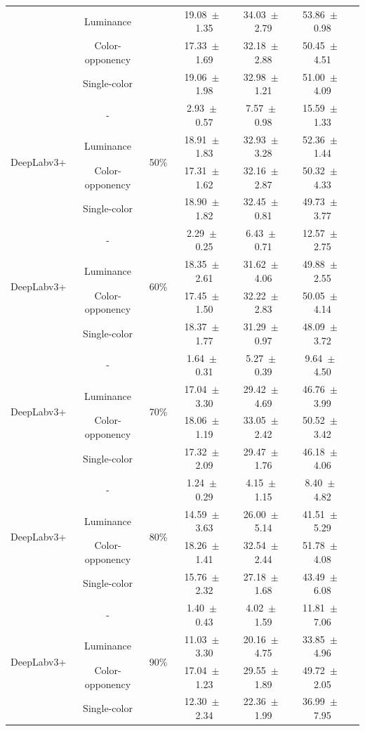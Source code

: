 \begin{table}[h]
\begin{tabular}{@{}lccc ccc@{}}
& Luminance & & 19.08~$\pm$~1.35 & 34.03~$\pm$~2.79 & 53.86~$\pm$~0.98 \\
& Color-opponency & & 17.33~$\pm$~1.69 & 32.18~$\pm$~2.88 & 50.45~$\pm$~4.51 \\
& Single-color & & 19.06~$\pm$~1.98 & 32.98~$\pm$~1.21 & 51.00~$\pm$~4.09 \\
\midrule
\multirow{4}{*}{DeepLabv3+} & - & \multirow{4}{*}{50\%} & 2.93~$\pm$~0.57 & 7.57~$\pm$~0.98 & 15.59~$\pm$~1.33 \\
& Luminance & & 18.91~$\pm$~1.83 & 32.93~$\pm$~3.28 & 52.36~$\pm$~1.44 \\
& Color-opponency & & 17.31~$\pm$~1.62 & 32.16~$\pm$~2.87 & 50.32~$\pm$~4.33 \\
& Single-color & & 18.90~$\pm$~1.82 & 32.45~$\pm$~0.81 & 49.73~$\pm$~3.77 \\
\midrule
\multirow{4}{*}{DeepLabv3+} & - & \multirow{4}{*}{60\%} & 2.29~$\pm$~0.25 & 6.43~$\pm$~0.71 & 12.57~$\pm$~2.75 \\
& Luminance & & 18.35~$\pm$~2.61 & 31.62~$\pm$~4.06 & 49.88~$\pm$~2.55 \\
& Color-opponency & & 17.45~$\pm$~1.50 & 32.22~$\pm$~2.83 & 50.05~$\pm$~4.14 \\
& Single-color & & 18.37~$\pm$~1.77 & 31.29~$\pm$~0.97 & 48.09~$\pm$~3.72 \\
\midrule
\multirow{4}{*}{DeepLabv3+} & - & \multirow{4}{*}{70\%} & 1.64~$\pm$~0.31 & 5.27~$\pm$~0.39 & 9.64~$\pm$~4.50 \\
& Luminance & & 17.04~$\pm$~3.30 & 29.42~$\pm$~4.69 & 46.76~$\pm$~3.99 \\
& Color-opponency & & 18.06~$\pm$~1.19 & 33.05~$\pm$~2.42 & 50.52~$\pm$~3.42 \\
& Single-color & & 17.32~$\pm$~2.09 & 29.47~$\pm$~1.76 & 46.18~$\pm$~4.06 \\
\midrule
\multirow{4}{*}{DeepLabv3+} & - & \multirow{4}{*}{80\%} & 1.24~$\pm$~0.29 & 4.15~$\pm$~1.15 & 8.40~$\pm$~4.82 \\
& Luminance & & 14.59~$\pm$~3.63 & 26.00~$\pm$~5.14 & 41.51~$\pm$~5.29 \\
& Color-opponency & & 18.26~$\pm$~1.41 & 32.54~$\pm$~2.44 & 51.78~$\pm$~4.08 \\
& Single-color & & 15.76~$\pm$~2.32 & 27.18~$\pm$~1.68 & 43.49~$\pm$~6.08 \\
\midrule
\multirow{4}{*}{DeepLabv3+} & - & \multirow{4}{*}{90\%} & 1.40~$\pm$~0.43 & 4.02~$\pm$~1.59 & 11.81~$\pm$~7.06 \\
& Luminance & & 11.03~$\pm$~3.30 & 20.16~$\pm$~4.75 & 33.85~$\pm$~4.96 \\
& Color-opponency & & 17.04~$\pm$~1.23 & 29.55~$\pm$~1.89 & 49.72~$\pm$~2.05 \\
& Single-color & & 12.30~$\pm$~2.34 & 22.36~$\pm$~1.99 & 36.99~$\pm$~7.95 \\
\midrule
\bottomrule
\end{tabular}
\label{tab:sparse_results_deeplabv3plus_dark_zurich}
\end{table}